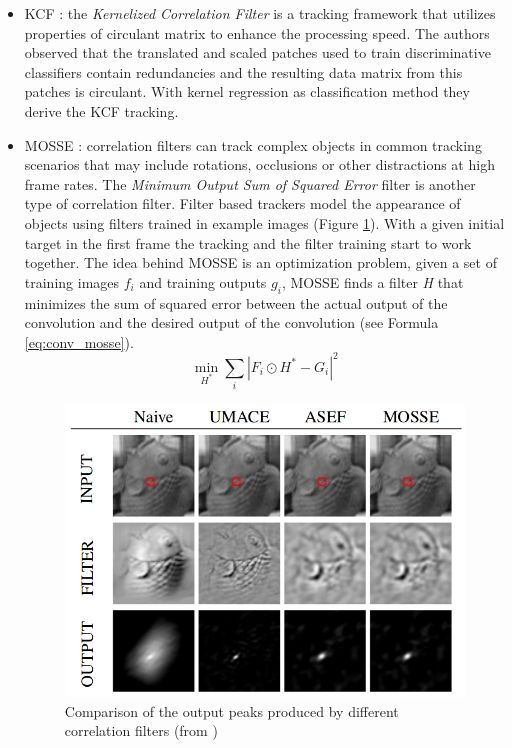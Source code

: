 \begin{itemize}
\item KCF \cite{henriques2012exploiting}: the \textit{Kernelized Correlation Filter} is a tracking framework that utilizes properties of circulant matrix to enhance the processing speed. The authors observed that the translated and scaled patches used to train discriminative classifiers contain redundancies and the resulting data matrix from this patches is circulant. With kernel regression as classification method they derive the KCF tracking.
\item MOSSE \cite{bolme2010visual}: correlation filters can track complex objects in common tracking scenarios that may include rotations, occlusions or other distractions at high frame rates. The \textit{Minimum Output Sum of Squared Error} filter is another type of correlation filter. Filter based trackers model the appearance of objects using filters trained in example images (Figure \ref{fig:mosse}). With a given initial target in the first frame the tracking and the filter training start to work together. The idea behind MOSSE is an optimization problem, given a set of training images $f_i$ and training outputs $g_i$, MOSSE finds a filter \textit{H} that minimizes the sum of squared error between the actual output of the convolution and the desired output of the convolution (see Formula \ref{eq:conv_mosse}).
\begin{equation}
\min_{H^*}\sum_{i}\left|F_i \odot H^* - G_i\right|^2
\label{eq:conv_mosse}
\end{equation}

\begin{figure}[H]
\begin{center}
\includegraphics[scale=0.35]{figures/mosse_filter.png}
\caption{Comparison of the output peaks produced by different correlation filters (from \cite{bolme2010visual})}
\label{fig:mosse}
\end{center}
\end{figure} 


\end{itemize}
